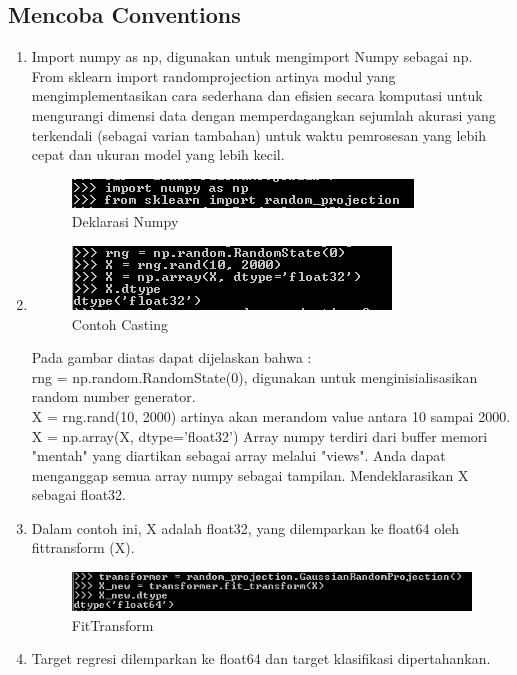 \subsection{Mencoba Conventions}
\begin{enumerate}
\item
Import numpy as np, digunakan untuk mengimport Numpy sebagai np.\\
From sklearn import randomprojection artinya modul yang mengimplementasikan cara sederhana dan efisien secara komputasi untuk mengurangi dimensi data dengan memperdagangkan sejumlah akurasi yang terkendali (sebagai varian tambahan) untuk waktu pemrosesan yang lebih cepat dan ukuran model yang lebih kecil.
\begin{figure}
	\begin{center}
   	 \includegraphics[scale=1]{figures/andri12.png}
   	 \caption{Deklarasi Numpy}	
	\end{center}
\end{figure}
\item
\begin{figure}
	\begin{center}
   	 \includegraphics[scale=1]{figures/andri13.png}
   	 \caption{Contoh  Casting}	
	\end{center}
\end{figure}
Pada gambar diatas dapat dijelaskan bahwa :\\
rng = np.random.RandomState(0), digunakan untuk menginisialisasikan random number generator.\\
X = rng.rand(10, 2000) artinya akan merandom value antara 10 sampai 2000.\\
X = np.array(X, dtype='float32') Array numpy terdiri dari buffer memori "mentah" yang diartikan sebagai array melalui "views". Anda dapat menganggap semua array numpy sebagai tampilan. Mendeklarasikan X sebagai float32.
\item
Dalam contoh ini, X adalah float32, yang dilemparkan ke float64 oleh fittransform (X).
\begin{figure}
	\begin{center}
   	 \includegraphics[scale=1]{figures/andri14.png}
   	 \caption{ FitTransform}
	\end{center}
\end{figure}
\item
Target regresi dilemparkan ke float64 dan target klasifikasi dipertahankan.


\end{enumerate}

